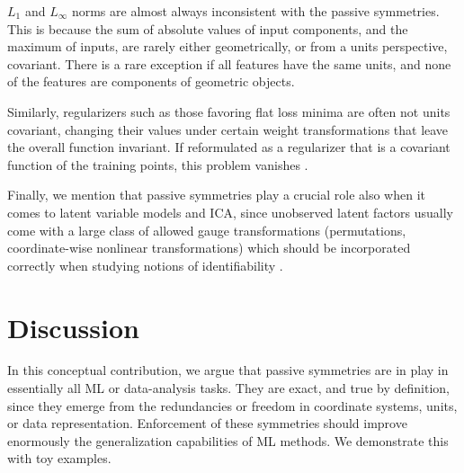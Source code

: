 \documentclass{article}
\theoremstyle{plain}
\theoremstyle{definition}
\theoremstyle{remark}
\begin{document}
$L_1$ and $L_\infty$ norms are almost always inconsistent with the passive symmetries.
This is because the sum of absolute values of input components, and the maximum of inputs, are rarely either geometrically, or from a units perspective, covariant.
There is a rare exception if all features have the same units, and none of the features are components of geometric objects.

Similarly, regularizers such as those favoring flat loss minima \cite{flatminima,sharpminima,petzka2021relative} are often not units covariant, changing their values under certain weight transformations that leave the overall function invariant. 
If reformulated as a regularizer that is a covariant function of the training points, this problem vanishes \cite{LuxburgBS04}.

Finally, we mention that passive symmetries play a crucial role also when it comes to latent variable models and ICA, since unobserved latent factors usually come with a large class of allowed gauge transformations (permutations, coordinate-wise nonlinear transformations) which should be incorporated correctly when studying notions of identifiability \cite{khemakhem2020ice, BucBesSch22}.

\section{Discussion}\label{sec:discussion}

In this conceptual contribution,
we argue that passive symmetries are in play in essentially all ML or data-analysis tasks.
They are exact, and true by definition, since they emerge from the redundancies or freedom in coordinate systems, units, or data representation.
Enforcement of these symmetries should improve enormously the generalization capabilities of ML methods.
We demonstrate this with toy examples.
\end{document}
